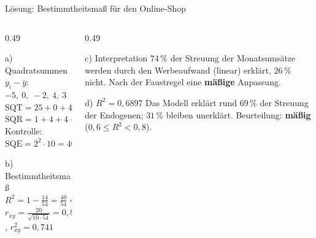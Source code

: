 \documentclass[aspectratio=169,11pt]{beamer}
\begin{document}
\begin{frame}{Lösung: Bestimmtheitsmaß für den Online-Shop}
  \begin{columns}[T]
    \begin{column}{0.49\textwidth}
      \small
      \begin{block}{a) Quadratsummen}
        $y_i - \bar{y}$: $-5,\ 0,\ -2,\ 4,\ 3$\\[2pt]
        $\text{SQT} = 25 + 0 + 4 + 16 + 9 = \mathbf{54}$\\[2pt]
        $\text{SQR} = 1 + 4 + 4 + 4 + 1 = \mathbf{14}$\\[2pt]
        Kontrolle: $\text{SQE} = 2^{2} \cdot 10 = 40 = 54 - 14$ \checkmark
      \end{block}
      \begin{block}{b) Bestimmtheitsmaß}
        $R^{2} = 1 - \frac{14}{54} = \frac{40}{54} = \mathbf{0{,}741}$\\[3pt]
        $r_{xy} = \frac{20}{\sqrt{10 \cdot 54}} = 0{,}8607$, \;
        $r_{xy}^{2} = 0{,}741$ \checkmark
      \end{block}
    \end{column}
    \begin{column}{0.49\textwidth}
      \small
      \begin{exampleblock}{c) Interpretation}
        $74\,\%$ der Streuung der Monatsumsätze werden durch den Werbeaufwand
        (linear) erklärt, $26\,\%$ nicht. Nach der Faustregel eine
        \textbf{mäßige} Anpassung.
      \end{exampleblock}
      \begin{exampleblock}{d) $R^{2} = 0{,}6897$}
        Das Modell erklärt rund $69\,\%$ der Streuung der Endogenen;
        $31\,\%$ bleiben unerklärt. Beurteilung: \textbf{mäßig}
        ($0{,}6 \le R^{2} < 0{,}8$).
      \end{exampleblock}
    \end{column}
  \end{columns}
\end{frame}
\end{document}
